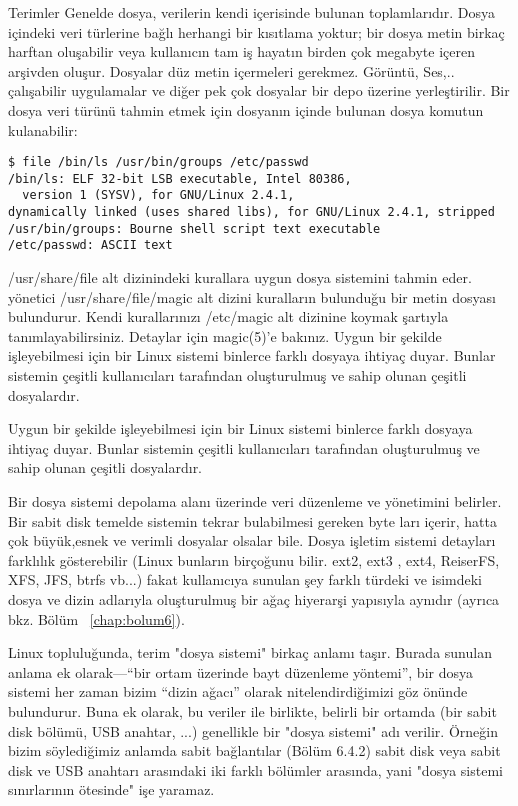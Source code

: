 \begin{section}{Terimler}
Genelde dosya, verilerin kendi içerisinde bulunan toplamlarıdır. Dosya içindeki veri türlerine bağlı herhangi bir kısıtlama yoktur; bir dosya metin birkaç harftan oluşabilir veya kullanıcın tam iş hayatın birden çok megabyte içeren arşivden oluşur. Dosyalar düz metin içermeleri gerekmez. Görüntü, Ses,.. çalışabilir uygulamalar ve diğer pek çok dosyalar bir depo üzerine yerleştirilir. Bir dosya veri türünü tahmin etmek için dosyanın içinde bulunan dosya komutun kulanabilir:

\begin{verbatim}
$ file /bin/ls /usr/bin/groups /etc/passwd
/bin/ls: ELF 32-bit LSB executable, Intel 80386,
  version 1 (SYSV), for GNU/Linux 2.4.1,
dynamically linked (uses shared libs), for GNU/Linux 2.4.1, stripped
/usr/bin/groups: Bourne shell script text executable
/etc/passwd: ASCII text
\end{verbatim}

/usr/share/file alt dizinindeki kurallara uygun dosya sistemini tahmin eder.
yönetici /usr/share/file/magic alt dizini kuralların bulunduğu bir metin dosyası
bulundurur. Kendi kurallarınızı /etc/magic alt dizinine koymak şartıyla
tanımlayabilirsiniz. Detaylar için magic(5)'e bakınız. Uygun bir şekilde işleyebilmesi için bir Linux sistemi binlerce farklı dosyaya ihtiyaç duyar. Bunlar sistemin çeşitli kullanıcıları tarafından oluşturulmuş ve sahip olunan çeşitli
dosyalardır.

Uygun bir şekilde işleyebilmesi için bir Linux sistemi binlerce farklı dosyaya ihtiyaç duyar. Bunlar sistemin çeşitli kullanıcıları tarafından oluşturulmuş ve sahip olunan çeşitli dosyalardır.

Bir dosya sistemi depolama alanı üzerinde veri düzenleme ve yönetimini belirler. Bir sabit disk temelde sistemin tekrar bulabilmesi gereken byte ları içerir, hatta çok büyük,esnek ve verimli dosyalar olsalar bile. Dosya işletim sistemi detayları farklılık gösterebilir (Linux bunların birçoğunu bilir. ext2, ext3 , ext4, ReiserFS, XFS, JFS, btrfs vb...) fakat kullanıcıya sunulan şey farklı türdeki ve isimdeki dosya ve dizin adlarıyla oluşturulmuş bir ağaç hiyerarşi yapısıyla aynıdır (ayrıca bkz. Bölüm ~\ref{chap:bolum6}).

Linux topluluğunda, terim "dosya sistemi" birkaç anlamı taşır. Burada sunulan anlama ek olarak—“bir ortam üzerinde bayt düzenleme yöntemi”, bir dosya sistemi her zaman bizim “dizin ağacı” olarak nitelendirdiğimizi göz önünde bulundurur. Buna ek olarak, bu veriler ile birlikte, belirli bir ortamda (bir sabit disk bölümü, USB anahtar, ...) genellikle bir "dosya sistemi" adı verilir. Örneğin bizim söylediğimiz anlamda sabit bağlantılar (Bölüm 6.4.2) sabit disk veya sabit disk ve USB anahtarı arasındaki iki farklı bölümler arasında, yani "dosya sistemi sınırlarının ötesinde" işe yaramaz.
\end{section}
